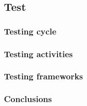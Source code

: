 \subsection{Test}

\subsubsection{Testing cycle}
\subsubsection{Testing activities}
\subsubsection{Testing frameworks}
\subsubsection{Conclusions}